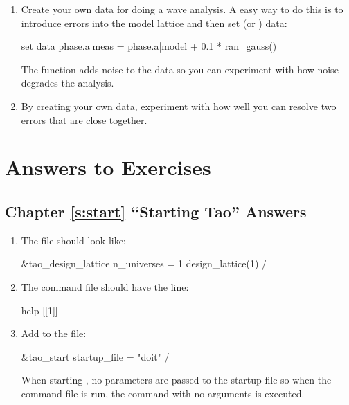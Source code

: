 \documentclass{hitec}     %
\newcommand{\Section}[1]{\section{#1}\vspace*{-1ex}}
\begin{document}
\begin{enumerate}[label=\thesection.\arabic{enumi}]
\item
Create your own data for doing a wave analysis. A easy way to do this is to introduce errors into
the model lattice and then set  (or ) data:
\begin{code}
set data phase.a|meas = phase.a|model + 0.1 * ran_gauss()
\end{code}
The  function adds noise to the data so you can experiment with how noise degrades
the analysis.
%
\item
By creating your own data, experiment with how well you can resolve two errors that are close
together.
\end{enumerate}

\newpage




\newpage

\Section{Answers to Exercises}
\label{s:ans}

\subsection[Chapter \ref*{s:start.ex} ``Starting Tao'']{Chapter \hyperref[s:start.ex]{\ref*{s:start}} ``Starting Tao'' Answers}
\label{s:ans.start}

\begin{enumerate}[label=\ref*{s:start}.\arabic{enumi}]
\item
The  file should look like:
\begin{code}
&tao_design_lattice
  n_universes = 1
  design_lattice(1)%
/
\end{code}
%
\item
The command file should have the line:
\begin{code}
help [[1]]
\end{code}
%
\item
Add to the  file:
\begin{code}
&tao_start
  startup_file = "doit"
/
\end{code}
When starting \tao, no parameters are passed to the startup file so when the command file is run,
the  command with no arguments is executed.
\end{enumerate}
\end{document}
